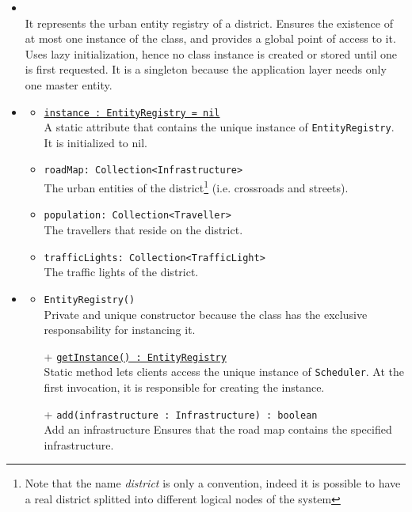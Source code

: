 \begin{itemize}
  \item \textbf{\descr} \\
  It represents the urban entity registry of a district.
  Ensures the existence of at most one instance of the class, 
  and provides a global point of access to it.
  Uses lazy initialization, hence no class instance is created 
  or stored until one is first requested.
  It is a singleton because the application layer needs 
  only one master entity.
  \item \textbf{\attrs}
  \begin{itemize}
    \item \texttt{\underline{instance : EntityRegistry = nil}} \\
    A static attribute that contains the unique instance of \texttt{EntityRegistry}.
    It is initialized to nil.
    \item \texttt{roadMap: Collection<Infrastructure>} \\
    The urban entities of the district\footnote{Note that the name 
    \textit{district} is only a convention, indeed it is possible to have a 
    real district splitted into different logical nodes of the system}
    (i.e. crossroads and streets). 
    \item \texttt{population: Collection<Traveller>} \\
    The travellers that reside on the district.
    \item \texttt{trafficLights: Collection<TrafficLight>} \\
    The traffic lights of the district.
  \end{itemize}
  \item \textbf{\ops}
  \begin{itemize}
    \item \texttt{EntityRegistry()} \\
    Private and unique constructor because the class has the exclusive 
    responsability for instancing it.
    \item[+] \texttt{\underline{getInstance() : EntityRegistry}} \\
    Static method lets clients access the unique instance 
    of \texttt{Scheduler}. At the first invocation, it is responsible 
    for creating the instance.
    \item[+] \texttt{add(infrastructure : Infrastructure) : boolean} \\
    Add an infrastructure
    Ensures that the road map contains the specified infrastructure.

\end{itemize}
\end{itemize}
